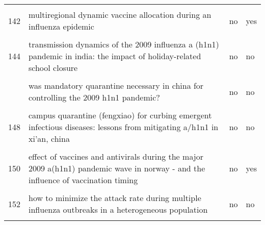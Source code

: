 \documentclass[
]{article}
\begin{document}
\begin{landscape}
\begin{longtable}{l>{\raggedright\arraybackslash}p{4cm}l>{\raggedright\arraybackslash}p{4cm}}
\addlinespace
\cellcolor{gray!6}{141} & \cellcolor{gray!6}{estimated impact of aggressive empirical antiviral treatment in containing an outbreak of pandemic influenza h1n1 in an isolated first nations community} & \cellcolor{gray!6}{no} & \cellcolor{gray!6}{no}\\
142 & multiregional dynamic vaccine allocation during an influenza epidemic & no & yes\\
\cellcolor{gray!6}{143} & \cellcolor{gray!6}{policies to reduce influenza in the workplace: impact assessments using an agent-based model} & \cellcolor{gray!6}{no} & \cellcolor{gray!6}{no}\\
144 & transmission dynamics of the 2009 influenza a (h1n1) pandemic in india: the impact of holiday-related school closure & no & no\\
\cellcolor{gray!6}{145} & \cellcolor{gray!6}{vaccination against foot-and-mouth disease: do initial conditions affect its benefit?} & \cellcolor{gray!6}{no} & \cellcolor{gray!6}{yes}\\
\addlinespace
146 & was mandatory quarantine necessary in china for controlling the 2009 h1n1 pandemic? & no & no\\
\cellcolor{gray!6}{147} & \cellcolor{gray!6}{a contact-network-based simulation model for evaluating interventions under 'what-if' scenarios in epidemic} & \cellcolor{gray!6}{no} & \cellcolor{gray!6}{no}\\
148 & campus quarantine (fengxiao) for curbing emergent infectious diseases: lessons from mitigating a/h1n1 in xi'an, china & no & no\\
\cellcolor{gray!6}{149} & \cellcolor{gray!6}{dynamic modelling of costs and health consequences of school closure during an influenza pandemic} & \cellcolor{gray!6}{no} & \cellcolor{gray!6}{no}\\
150 & effect of vaccines and antivirals during the major 2009 a(h1n1) pandemic wave in norway - and the influence of vaccination timing & no & yes\\
\addlinespace
\cellcolor{gray!6}{151} & \cellcolor{gray!6}{estimating the value of containment strategies in delaying the arrival time of an influenza pandemic: a case study of travel restriction and patient isolation} & \cellcolor{gray!6}{no} & \cellcolor{gray!6}{no}\\
152 & how to minimize the attack rate during multiple influenza outbreaks in a heterogeneous population & no & no\\
\cellcolor{gray!6}{153} & \cellcolor{gray!6}{modeling strategies for controlling h1n1 outbreaks in china} & \cellcolor{gray!6}{no} & \cellcolor{gray!6}{no}\\

\end{longtable}
\end{landscape}
\end{document}
